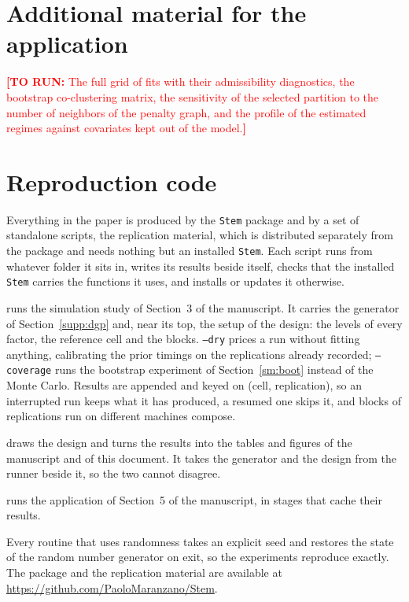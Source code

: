 \documentclass[11pt]{article}
\newcommand{\TODO}[1]{\textcolor{red}{\textbf{[TO RUN:} #1\textbf{]}}}
\newcommand{\Stem}{\texttt{Stem}}
\begin{document}
\section{Additional material for the application}\label{sm:app}
\TODO{The full grid of fits with their admissibility diagnostics, the bootstrap co-clustering matrix, the sensitivity of the selected partition to the number of neighbors of the penalty graph, and the profile of the estimated regimes against covariates kept out of the model.}

\section{Reproduction code}\label{sm:code}

Everything in the paper is produced by the \Stem{} package \citep{StemPackage} and by a set of standalone scripts, the replication material, which is distributed separately from the package and needs nothing but an installed \Stem{}. Each script runs from whatever folder it sits in, writes its results beside itself, checks that the installed \Stem{} carries the functions it uses, and installs or updates it otherwise.

\begin{description}[leftmargin=1.6em,itemsep=3pt,topsep=3pt]
  \item[\texttt{run-simulations.R}] runs the simulation study of Section~3 of the manuscript. It carries the generator of Section~\ref{supp:dgp} and, near its top, the setup of the design: the levels of every factor, the reference cell and the blocks. \texttt{--dry} prices a run without fitting anything, calibrating the prior timings on the replications already recorded; \texttt{--coverage} runs the bootstrap experiment of Section~\ref{sm:boot} instead of the Monte Carlo. Results are appended and keyed on (cell, replication), so an interrupted run keeps what it has produced, a resumed one skips it, and blocks of replications run on different machines compose.
  \item[\texttt{analyse-simulations.R}] draws the design and turns the results into the tables and figures of the manuscript and of this document. It takes the generator and the design from the runner beside it, so the two cannot disagree.
  \item[\texttt{run-application.R}] runs the application of Section~5 of the manuscript, in stages that cache their results.
\end{description}

Every routine that uses randomness takes an explicit seed and restores the state of the random number generator on exit, so the experiments reproduce exactly. The package and the replication material are available at \url{https://github.com/PaoloMaranzano/Stem}.



\end{document}
